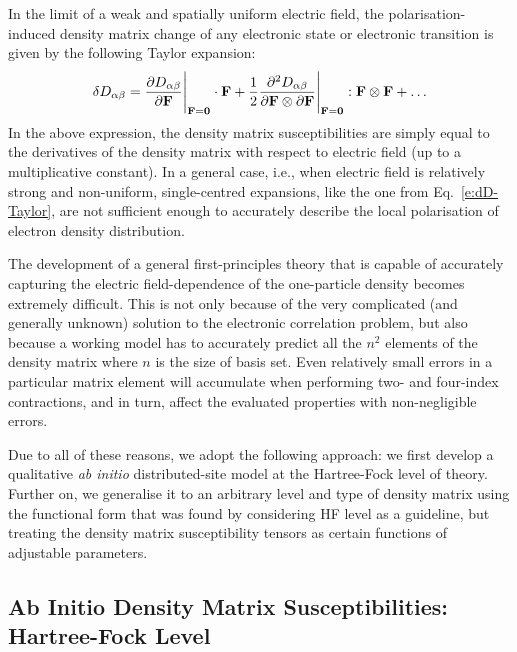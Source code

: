\documentclass[aip,amsmath,amssymb,reprint,floatfix]{revtex4-1}
\begin{document}
In the limit of a weak and spatially uniform electric field,
the polarisation\hyp{}induced density matrix change of any electronic state
or electronic transition is given by the following Taylor expansion:
%
\begin{equation}\label{e:dD-Taylor}
 \delta D_{\alpha\beta} = \frac{\partial D_{\alpha\beta}}{\partial {\bf F}}\Bigg|_{{\bf F}={\bf 0}}  \cdot {\bf F} 
   + \frac{1}{2} 
     \frac{\partial^2 D_{\alpha\beta}}{\partial {\bf F} \otimes \partial {\bf F}}\Bigg|_{{\bf F}={\bf 0}} : {\bf F} \otimes {\bf F}
   + \ldots 
\end{equation}
%
In the above expression, the density matrix susceptibilities 
are simply equal to the derivatives of the density matrix
with respect to electric field (up to a multiplicative constant).
In a general case, i.e., when electric field is relatively strong 
and non\hyp{}uniform, single\hyp{}centred expansions, like the one 
from Eq.~\eqref{e:dD-Taylor},
are not sufficient enough to accurately describe the local polarisation
of electron density distribution.

The development of a general first\hyp{}principles theory
that is capable of accurately capturing the electric field\hyp{}dependence 
of the one\hyp{}particle density becomes extremely difficult. This is not 
only because of the very complicated (and generally unknown) solution
to the electronic correlation problem, but also because a working model 
has to accurately predict all the $n^2$ elements of the density matrix
where $n$ is the size of basis set. Even relatively small errors
in a particular matrix element will accumulate when performing two\hyp{}
and four\hyp{}index contractions, and in turn, affect the evaluated properties 
with non\hyp{}negligible errors. 

Due to all of these reasons, we adopt the following approach: 
we first develop a qualitative \emph{ab initio} distributed\hyp{}site 
model at the Hartree\hyp{}Fock level of theory. Further on, we generalise it 
to an arbitrary level and type of density matrix
using the functional form that was found by considering HF level as a guideline,
but treating the density matrix susceptibility tensors as certain functions 
of adjustable parameters.

\subsection{Ab Initio Density Matrix Susceptibilities: Hartree-Fock Level}
\end{document}
